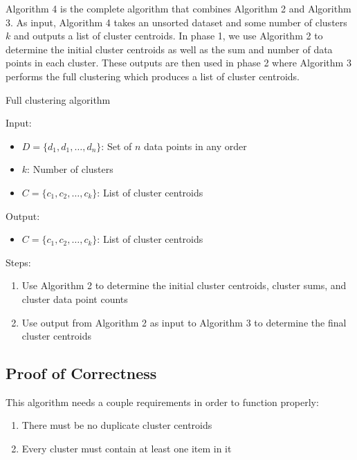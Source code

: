 \documentclass[conference,compsoc]{IEEEtran}
\begin{document}
Algorithm 4 is the complete algorithm that combines Algorithm 2 and Algorithm 3. As input, Algorithm 4 takes an unsorted dataset and some number of clusters $k$ and outputs a list of cluster centroids. In phase 1, we use Algorithm 2 to determine the initial cluster centroids as well as the sum and number of data points in each cluster. These outputs are then used in phase 2 where Algorithm 3 performs the full clustering which produces a list of cluster centroids.


\begin{algorithm}\label{alg-4}
    \caption{Full clustering algorithm}
    Input:
        \begin{itemize}
            \item $D = \{d_1, d_1, \dots, d_n\}$: Set of $n$ data points in any order
            \item $k$: Number of clusters
            \item $C = \{c_1, c_2, \dots, c_k\}$: List of cluster centroids
        \end{itemize}
    Output:
        \begin{itemize}
            \item $C = \{c_1, c_2, \dots, c_k\}$: List of cluster centroids
        \end{itemize}
    Steps:
        \begin{enumerate}
            \item Use Algorithm 2 to determine the initial cluster centroids, cluster sums, and cluster data point counts
            \item Use output from Algorithm 2 as input to Algorithm 3 to determine the final cluster centroids
        \end{enumerate}
\end{algorithm}


\subsection{Proof of Correctness}

This algorithm needs a couple requirements in order to function properly:
\begin{enumerate}
    \item There must be no duplicate cluster centroids
    \item Every cluster must contain at least one item in it
\end{enumerate}
\end{document}
